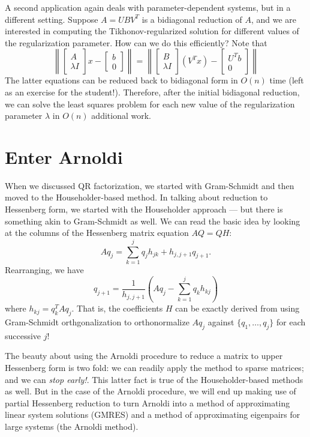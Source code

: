 \documentclass[12pt, leqno]{article} %
\begin{document}
A second application again deals with parameter-dependent
systems, but in a different setting.  Suppose $A = UBV^T$ is a
bidiagonal reduction of $A$, and we are interested in computing
the Tikhonov-regularized solution for different values of the
regularization parameter.  How can we do this efficiently?
Note that
\[
\left\|
\begin{bmatrix} A \\ \lambda I \end{bmatrix} x -
\begin{bmatrix} b \\ 0 \end{bmatrix}
\right\| =
\left\|
\begin{bmatrix}
  B \\
  \lambda I
\end{bmatrix}
(V^T x) -
\begin{bmatrix}
  U^T b \\
  0
\end{bmatrix}
\right\|
\]
The latter equations can be reduced back to bidiagonal form in $O(n)$
time (left as an exercise for the student!).  Therefore, after the
initial bidiagonal reduction, we can solve the least squares
problem for each new value of the regularization parameter $\lambda$
in $O(n)$ additional work.

\section{Enter Arnoldi}

When we discussed QR factorization, we started with Gram-Schmidt and
then moved to the Householder-based method.  In talking about
reduction to Hessenberg form, we started with the Householder approach
--- but there is something akin to Gram-Schmidt as well.  We can read
the basic idea by looking at the columns of the Hessenberg matrix
equation $A Q = Q H$:
\[
  A q_{j} = \sum_{k=1}^j q_j h_{jk} + h_{j,j+1} q_{j+1}.
\]
Rearranging, we have
\[
  q_{j+1} = \frac{1}{h_{j,j+1}} \left( A q_{j} - \sum_{k=1}^j q_k
  h_{kj} \right)
\]
where $h_{kj} = q_k^T A q_j$.  That is, the coefficients $H$ can be
exactly derived from using Gram-Schmidt orthgonalization to
orthonormalize $A q_j$ against $\{q_1, \ldots, q_j\}$ for each
successive $j$!

The beauty about using the Arnoldi procedure to reduce a matrix to
upper Hessenberg form is two fold: we can readily apply
the method to sparse matrices; and we can {\em stop early!}.
This latter fact is true of the Householder-based methods as well.
But in the case of the Arnoldi procedure, we will end up making
use of partial Hessenberg reduction to turn Arnoldi into a method of
approximating linear system solutions (GMRES) and a method of
approximating eigenpairs for large systems (the Arnoldi method).
\end{document}
